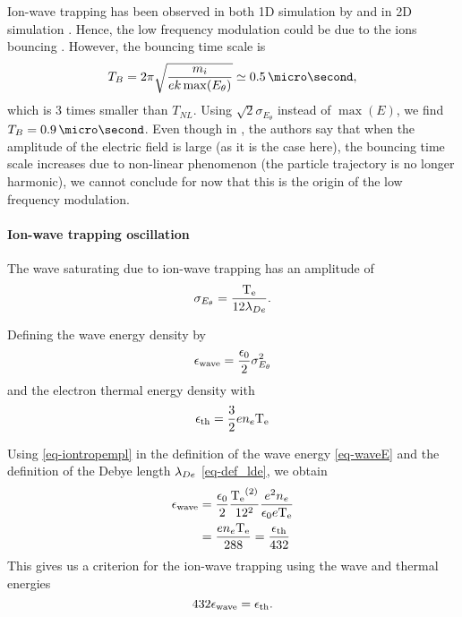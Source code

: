     Ion-wave trapping has been observed in both \ac{1D} simulation by \citet{lafleur2016a} and in \ac{2D} simulation \citep{croes2017a}.
    Hence, the low frequency modulation could be due to the ions bouncing \citep{belmont2013}.
    However, the bouncing time scale is 
    \begin{equation} \label{eq-TB}
      T_{B} = 2 \pi \sqrt{\frac{m_i}{e k \max(E_{\theta})} } \simeq 0.5 \,\micro\second,
    \end{equation}
    which is 3 times smaller than $T_{NL}$.
    Using $\sqrt{2} \sigma_{E_{\theta}}$ instead of $\max(E)$, we find $T_B = 0.9\,\micro\second$.
    Even though in \citet{belmont2013}, the authors say that when the amplitude of the electric field is large (as it is the case here), the bouncing time scale increases due to non-linear phenomenon (the particle trajectory is no longer harmonic), we cannot conclude for now that this is the origin of the low frequency modulation.

  
  \paragraph{Ion-wave trapping oscillation\\}
    The wave saturating due to ion-wave trapping has an amplitude of \citep{lafleur2017,boeuf2018}
     \begin{equation} \label{eq-iontropempl}
       \sigma_{E_{\theta}} = \frac{\mathrm{T_e}}{12 \lambda_{De}}.
     \end{equation}
    
    Defining the wave energy  density by
    \begin{equation} \label{eq-waveE}
      \epsilon_{\rm wave} = \frac{\epsilon_0}{2} \sigma_{E_{\theta}}^2
    \end{equation}
    and the electron thermal energy density with
    \begin{equation} \label{eq-thE}
      \epsilon_{\rm th} = \frac{3}{2} e n_e \mathrm{T_e}
    \end{equation}
    
    Using \cref{eq-iontropempl} in the definition of the wave energy \cref{eq-waveE} and the definition of the Debye length $\lambda_{De}$ \cref{eq-def_lde}, we obtain
    \begin{align*} \label{eq-step_1}
      \epsilon_{\rm wave} &=  \frac{\epsilon_0}{2} \frac{\mathrm{T_e}^{(2)}}{12^2} \frac{e^2 n_e}{ \epsilon_0 e\mathrm{T_e}}\\
      &= \frac{e n_e \mathrm{T_e} }{288} = \frac{\epsilon_{\rm th}}{432}
    \end{align*}
    This gives us a criterion for the ion-wave trapping using the wave and thermal energies
    \begin{equation} \label{eq-criteriaIT}
      432 \epsilon_{\rm wave} = \epsilon_{\rm th}.
    \end{equation}
    
